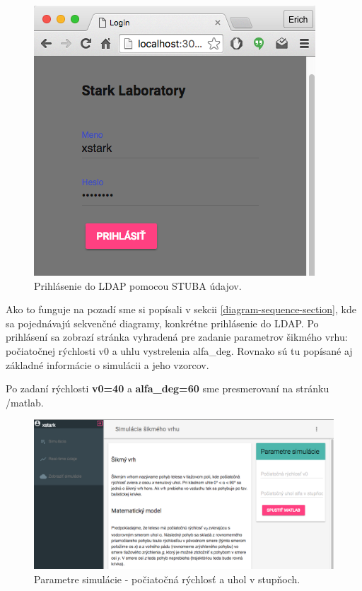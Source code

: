 \begin{figure}[H]
  \centering
  \includegraphics[scale=0.45]{img/code/angular-login.png}
  \caption{Prihlásenie do LDAP pomocou STUBA údajov.}
  \label{img-angular-login}
\end{figure}

Ako to funguje na pozadí sme si popísali v sekcii \ref{diagram-sequence-section}, kde sa pojednávajú sekvenčné diagramy, konkrétne prihlásenie do LDAP.
Po prihlásení sa zobrazí stránka vyhradená pre zadanie parametrov šikmého vrhu: počiatočnej rýchlosti v0 a uhlu vystrelenia alfa\_deg. Rovnako sú tu popísané aj základné informácie o simulácii a jeho vzorcov.

Po zadaní rýchlosti \textbf{v0=40} a \textbf{alfa\_deg=60} sme presmerovaní na stránku /matlab.

\begin{figure}[H]
  \centering
  \includegraphics[scale=0.42]{img/code/angular-simulation-param.png}
  \caption{Parametre simulácie - počiatočná rýchlosť a uhol v stupňoch.}
  \label{img-angular-params}
\end{figure}


